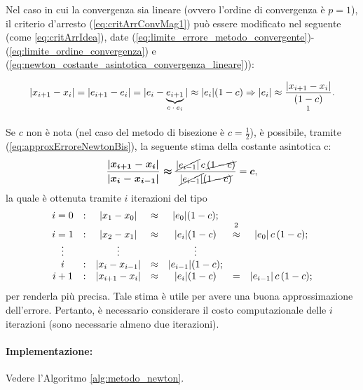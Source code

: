 Nel caso in cui la convergenza sia lineare (ovvero l'ordine di convergenza è $p=1$), il criterio d'arresto (\ref{eq:critArrConvMag1}) può essere modificato nel seguente (come \ref{eq:critArrIdea}), date (\ref{eq:limite_errore_metodo_convergente})-(\ref{eq:limite_ordine_convergenza}) e (\ref{eq:newton_costante_asintotica_convergenza_lineare})):

\begin{equation}\label{eq:approxErroreNewtonBis}
	|x_{i+1}-x_i|=|e_{i+1}-e_i|=|e_i-\underbrace{e_{i+1}}_\text{$c\cdot e_i$}|\approx |e_i|(1-c)\Rightarrow |e_i|\approx\frac{|x_{i+1}-x_i|}{\underset{\footnotemark}{(1-c)}}.
\end{equation}

Se $c$ non è nota (nel caso del metodo di bisezione è $c=\frac{1}{2}$), è possibile, tramite (\ref{eq:approxErroreNewtonBis}), la seguente stima della costante asintotica c:
\begin{equation*}
	\boldsymbol{\frac{|x_{i+1}-x_i|}{|x_i-x_{i-1}|}\approx}\frac{\cancel{|e_{i-1}|}\,c\,\cancel{(1-c)}}{\cancel{|e_{i-1}|}\cancel{(1-c)}}=\boldsymbol c,
\end{equation*}
la quale è ottenuta tramite $i$ iterazioni del tipo
\begin{equation*}
	\begin{matrix}
		i=0 &:& |x_1-x_0|&\approx& |e_0|(1-c);\\
		i=1 &:& |x_2-x_1|&\approx&|e_i|(1-c)&\overset{\footnotemark}{\approx}&|e_0|\, c\, (1-c);\\
		\vdots & & \vdots & & \vdots \\
		i &:&|x_i-x_{i-1}|&\approx& |e_{i-1}|(1-c);\\
		i+1 &:&|x_{i+1}-x_i|&\approx& |e_i|(1-c) &=& |e_{i-1}|\, c\, (1-c);
	\end{matrix}
\end{equation*}
per renderla più precisa. Tale stima è utile per avere una buona  approssimazione dell'errore. Pertanto, è necessario considerare il costo computazionale delle $i$ iterazioni (sono necessarie almeno due iterazioni).

\paragraph{Implementazione:} Vedere l'Algoritmo \ref{alg:metodo_newton}.

